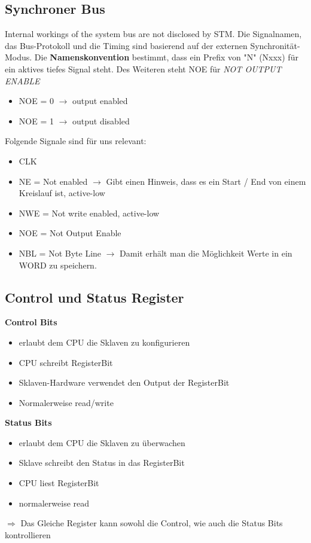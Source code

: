 \documentclass{article}
\begin{document}
\subsection{Synchroner Bus}
Internal workings of the system bus are not disclosed by STM. Die Signalnamen, das Bus-Protokoll und die Timing sind basierend auf der externen Synchronität-Modus. Die \textbf{Namenskonvention} bestimmt, dass ein Prefix von "N" (Nxxx) für ein aktives tiefes Signal steht. Des Weiteren steht NOE für \textit{NOT OUTPUT ENABLE}
\begin{itemize}
	\item NOE = 0 $\rightarrow$ output enabled
	\item NOE = 1 $\rightarrow$ output disabled
\end{itemize}
Folgende Signale sind für uns relevant:
\begin{itemize}
	\item CLK
	\item NE = Not enabled $\rightarrow$ Gibt einen Hinweis, dass es ein Start / End von einem Kreislauf ist, active-low
	\item NWE = Not write enabled, active-low
	\item NOE = Not Output Enable
	\item NBL = Not Byte Line $\rightarrow$ Damit erhält man die Möglichkeit Werte in ein WORD zu speichern. 
\end{itemize}

\subsection{Control und Status Register}
\textbf{Control Bits}
\begin{itemize}
	\item erlaubt dem CPU die Sklaven zu konfigurieren
	\item CPU schreibt RegisterBit
	\item Sklaven-Hardware verwendet den Output der RegisterBit
	\item Normalerweise read/write
\end{itemize}
\textbf{Status Bits}
\begin{itemize}
	\item erlaubt dem CPU die Sklaven zu überwachen
	\item Sklave schreibt den Status in das RegisterBit
	\item CPU liest RegisterBit
	\item normalerweise read
\end{itemize}
$\Rightarrow$ Das Gleiche Register kann sowohl die Control, wie auch die Status Bits kontrollieren
\end{document}

